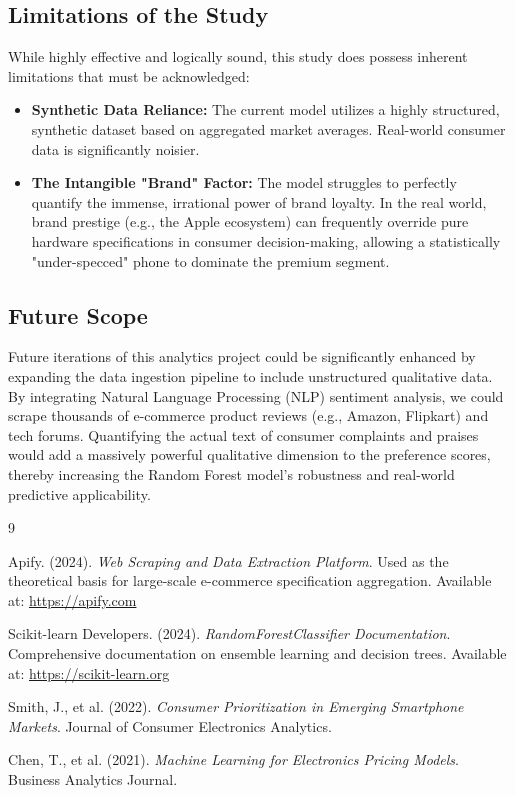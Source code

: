 \documentclass[12pt,a4paper]{article}
\begin{document}
\subsection{Limitations of the Study}
While highly effective and logically sound, this study does possess inherent limitations that must be acknowledged:
\begin{itemize}
    \item \textbf{Synthetic Data Reliance:} The current model utilizes a highly structured, synthetic dataset based on aggregated market averages. Real-world consumer data is significantly noisier.
    \item \textbf{The Intangible "Brand" Factor:} The model struggles to perfectly quantify the immense, irrational power of brand loyalty. In the real world, brand prestige (e.g., the Apple ecosystem) can frequently override pure hardware specifications in consumer decision-making, allowing a statistically "under-specced" phone to dominate the premium segment.
\end{itemize}

\subsection{Future Scope}
Future iterations of this analytics project could be significantly enhanced by expanding the data ingestion pipeline to include unstructured qualitative data. By integrating Natural Language Processing (NLP) sentiment analysis, we could scrape thousands of e-commerce product reviews (e.g., Amazon, Flipkart) and tech forums. Quantifying the actual text of consumer complaints and praises would add a massively powerful qualitative dimension to the preference scores, thereby increasing the Random Forest model's robustness and real-world predictive applicability.

\begin{thebibliography}{9}

Apify. (2024). \textit{Web Scraping and Data Extraction Platform}. Used as the theoretical basis for large-scale e-commerce specification aggregation. Available at: \url{https://apify.com}

Scikit-learn Developers. (2024). \textit{RandomForestClassifier Documentation}. Comprehensive documentation on ensemble learning and decision trees. Available at: \url{https://scikit-learn.org}

Smith, J., et al. (2022). \textit{Consumer Prioritization in Emerging Smartphone Markets}. Journal of Consumer Electronics Analytics.

Chen, T., et al. (2021). \textit{Machine Learning for Electronics Pricing Models}. Business Analytics Journal.

\end{thebibliography}
\end{document}
